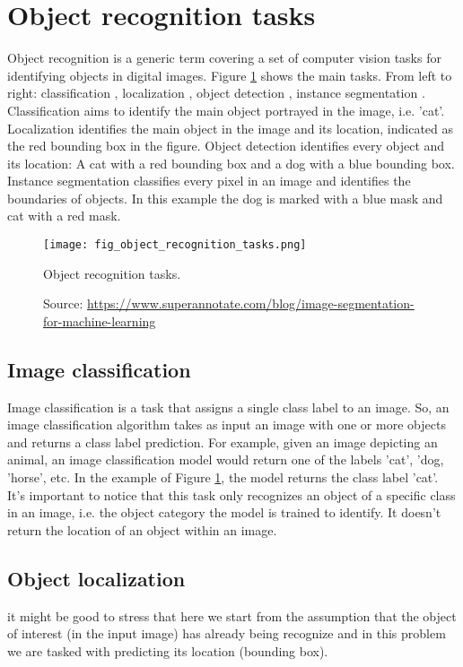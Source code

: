 \section{Object recognition tasks}
Object recognition is a generic term covering a set of computer vision tasks for identifying objects in digital images. Figure \ref{fig:object_recognition_tasks} shows the main tasks. From left to right: classification \cite{lecun1998gradient}, localization \cite{zhou2016cvpr}, object detection \cite{girshick2014rich}, instance segmentation \cite{He_2017_ICCV}. Classification aims to identify the main object portrayed in the image, i.e. 'cat'. Localization identifies the main object in the image and its location, indicated as the red bounding box in the figure. Object detection identifies every object and its location: A cat with a red bounding box and a dog with a blue bounding box. Instance segmentation classifies every pixel in an image and identifies the boundaries of objects. In this example the dog is marked with a blue mask and cat with a red mask.
\begin{figure}[ht]
    \begin{center}
    \texttt{[image: fig\_object\_recognition\_tasks.png]}
    \caption[Object recognition tasks]{
    Object recognition tasks.}
    \caption*{
    Source: \href{https://www.superannotate.com/blog/image-segmentation-for-machine-learning}{https://www.superannotate.com/blog/image-segmentation-for-machine-learning}}
    \label{fig:object_recognition_tasks}
    \end{center}
\end{figure}

\subsection{Image classification}
Image classification is a task that assigns a single class label to an image. So, an image classification algorithm takes as input an image with one or more objects and returns a class label prediction. For example, given an image depicting an animal, an image classification model would return one of the labels 'cat', 'dog, 'horse', etc. In the example of Figure \ref{fig:object_recognition_tasks}, the model returns the class label 'cat'. It's important to notice that this task only recognizes an object of a specific class in an image, i.e. the object category the model is trained to identify. It doesn't return the location of an object within an image.

\subsection{Object localization}
it might be good to stress that here we start from the assumption that the object of interest (in the input image) has already being recognize and in this problem we are tasked with predicting its location (bounding box).

